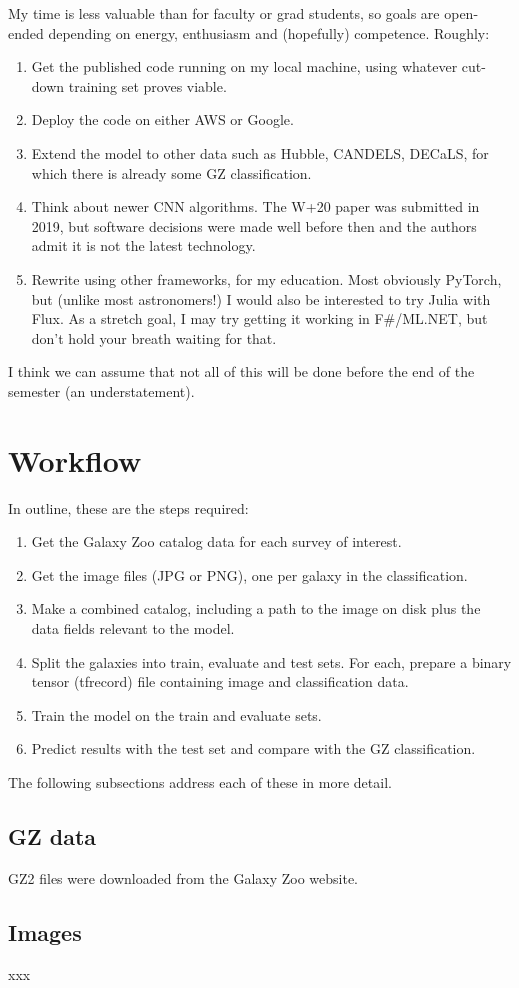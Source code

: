 \documentclass[twocolumn, twocolappendix, tighten]{aastex631}
\begin{document}
My time is less valuable than for faculty or grad students, so goals are open-ended depending on energy, enthusiasm and (hopefully) competence. Roughly:
\begin{enumerate}
	\item Get the published code running on my local machine, using whatever cut-down training set proves viable.
	\item Deploy the code on either AWS or Google.
	\item Extend the model to other data such as Hubble, CANDELS, DECaLS, for which there is already some GZ classification.
	\item Think about newer CNN algorithms. The W+20 paper was submitted in 2019, but software decisions were made well before then and the authors admit it is not the latest technology.
	\item Rewrite using other frameworks, for my education. Most obviously PyTorch, but (unlike most astronomers!) I would also be interested to try Julia with Flux. As a stretch goal, I may try getting it working in F\#/ML.NET, but don't hold your breath waiting for that.
\end{enumerate}

I think we can assume that not all of this will be done before the end of the semester (an understatement).

\section{Workflow}

In outline, these are the steps required:

\begin{enumerate}
	\item Get the Galaxy Zoo catalog data for each survey of interest.
	\item Get the image files (JPG or PNG), one per galaxy in the classification.
	\item Make a combined catalog, including a path to the image on disk plus the data fields relevant to the model.
	\item Split the galaxies into train, evaluate and test sets. For each, prepare a binary tensor (tfrecord) file containing image and classification data.
	\item Train the model on the train and evaluate sets.
	\item Predict results with the test set and compare with the GZ classification.
\end{enumerate}

The following subsections address each of these in more detail.

\subsection{GZ data}

GZ2 files were downloaded from the Galaxy Zoo website.

\subsection{Images}

xxx

{}

\end{document}

